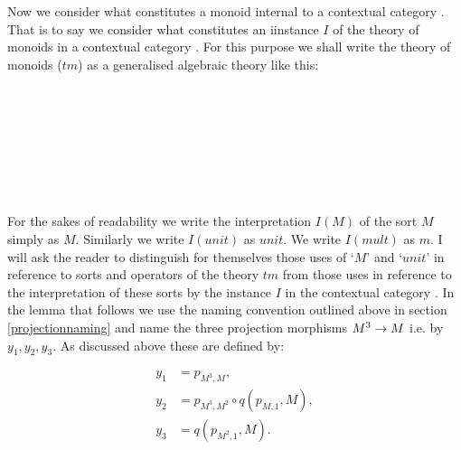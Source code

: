 
\note
Now we consider what constitutes a monoid internal to a contextual category \catc. That is to say 
we consider what constitutes an iinstance $I$ of the theory of monoids   in a contextual category \catc.
For this purpose we shall write the theory of monoids ($tm$) as a generalised algebraic theory like this: 
\begin{gatrules}
\gatintros
{}
 \\
 \\
 \\
\gataxioms

\begin{gatgroup}{}
 \\
\end{gatgroup} \\
\end{gatrules}
\note 
For the sakes of readability we write the interpretation $I(M)$ of the sort $M$ simply as $M$. Similarly we write $I(unit)$ as $unit$. We write $I(mult)$ as $m$. I will ask the reader  to distinguish for themselves 
those uses of `$M$' and `$unit$' in reference to sorts and operators of the theory $tm$ from those uses in reference to the interpretation of these sorts by the instance $I$ in the contextual category \catc. 
  In the  lemma that follows we use the naming convention outlined above in section \ref{projectionnaming} and name the three projection morphisms $M^3 \rightarrow M$ i.e. by $y_1, y_2, y_3$.
As discussed above these are defined by:

\begin{align*}
y_1 &= p_{M^3,M}, \\
y_2 &= p_{M^3,M^2} \circ q(p_{M,1},M), \\
y_3 &= q(p_{M^2,1},M). \hspace{1cm}\\
\end{align*}

\newcommand{\wM}{\ofT{w}{M}}
\newcommand{\xM}{\ofT{x_1, x_2}{M}}
\newcommand{\yM}{\ofT{y_1, y_2, y_3}{M}}
\newcommand{\doubleM}{M^2}                       %
\newcommand{\trebleM}{M^3}                       %
\newcommand{\quadM}{M^4}                         %
\newcommand{\spi}{s(p_{M^3,M^i})}
\newcommand{\sptrebleone}{s(p_{M^3,M^1})}
\newcommand{\sptrebletwo}{s(p_{M^3,M^2})}
\newcommand{\sptreblethree}{s(p_{M^3,M^3})}
\newcommand{\fmult}{m}  %

